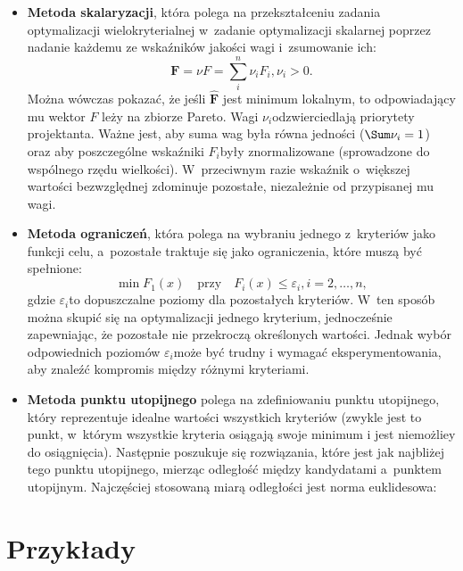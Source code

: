 \documentclass{article}
\begin{document}
    \begin{itemize}
        \item \textbf{Metoda skalaryzacji}, która polega na przekształceniu
        zadania optymalizacji wielokryterialnej w~zadanie optymalizacji
        skalarnej poprzez nadanie każdemu ze wskaźników jakości wagi i~zsumowanie ich:
        $$
            \mathbf{F} = \nu F = \sum_{i}^{n}\nu_{i}F_{i}, \nu_{i} > 0.
        $$
        Można wówczas pokazać, że jeśli $\hat{\textbf{F}}$ jest minimum lokalnym, to
        odpowiadający mu wektor $F$ leży na zbiorze Pareto.
        Wagi $\nu_{i}$​ odzwierciedlają priorytety projektanta. Ważne
        jest, aby suma wag była równa jedności ($\Sum\nu_{i} = 1$) oraz
        aby poszczególne wskaźniki $F_i$​ były znormalizowane (sprowadzone
        do wspólnego rzędu wielkości). W~przeciwnym razie wskaźnik o~większej
        wartości bezwzględnej zdominuje pozostałe, niezależnie od przypisanej mu
        wagi.
        
        \item \textbf{Metoda ograniczeń}, która polega na wybraniu jednego
        z~kryteriów
        jako funkcji celu, a~pozostałe traktuje się jako ograniczenia, które muszą być spełnione:
        $$
            \min F_{1}(x) \quad \text{przy} \quad F_{i}(x) \leq \varepsilon_{i}, i = 2, \ldots, n,
        $$
        gdzie $\varepsilon_{i}$​ to dopuszczalne poziomy dla pozostałych
        kryteriów. W~ten sposób
        można skupić się na optymalizacji jednego kryterium, jednocześnie
        zapewniając,
        że pozostałe nie przekroczą określonych wartości. Jednak wybór
        odpowiednich poziomów $\varepsilon_{i}$​ może być trudny i wymagać
        eksperymentowania, aby znaleźć kompromis między różnymi kryteriami.

        \item \textbf{Metoda punktu utopijnego} polega na zdefiniowaniu
        punktu utopijnego, który reprezentuje idealne wartości wszystkich
        kryteriów (zwykle jest to punkt, w~którym wszystkie kryteria osiągają
        swoje minimum i jest niemożliey do osiągnięcia). Następnie poszukuje
        się rozwiązania, które jest jak najbliżej tego punktu utopijnego,
        mierząc odległość między kandydatami a~punktem utopijnym. Najczęściej
        stosowaną miarą odległości jest norma euklidesowa:
    \end{itemize} 

\section{Przykłady}
\end{document}
